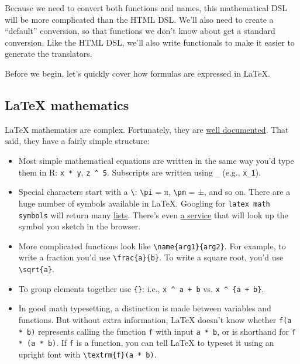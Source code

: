 Because we need to convert both functions and names, this mathematical
DSL will be more complicated than the HTML DSL. We'll also need to
create a ``default'' conversion, so that functions we don't know about
get a standard conversion. Like the HTML DSL, we'll also write
functionals to make it easier to generate the translators.

Before we begin, let's quickly cover how formulas are expressed in
LaTeX.

\subsection{LaTeX mathematics}

LaTeX mathematics are complex. Fortunately, they are
\href{http://en.wikibooks.org/wiki/LaTeX/Mathematics}{well documented}.
That said, they have a fairly simple structure:

\begin{itemize}
\item
  Most simple mathematical equations are written in the same way you'd
  type them in R: \texttt{x * y}, \texttt{z \^{} 5}. Subscripts are
  written using \texttt{\_} (e.g., \texttt{x\_1}).
\item
  Special characters start with a \texttt{\textbackslash{}}:
  \texttt{\textbackslash{}pi} = π, \texttt{\textbackslash{}pm} = ±, and
  so on. There are a huge number of symbols available in LaTeX. Googling
  for \texttt{latex math symbols} will return many
  \href{http://www.sunilpatel.co.uk/latex-type/latex-math-symbols/}{lists}.
  There's even \href{http://detexify.kirelabs.org/classify.html}{a
  service} that will look up the symbol you sketch in the browser.
\item
  More complicated functions look like
  \texttt{\textbackslash{}name\{arg1\}\{arg2\}}. For example, to write a
  fraction you'd use \texttt{\textbackslash{}frac\{a\}\{b\}}. To write a
  square root, you'd use \texttt{\textbackslash{}sqrt\{a\}}.
\item
  To group elements together use \texttt{\{\}}: i.e.,
  \texttt{x \^{} a + b} vs. \texttt{x \^{} \{a + b\}}.
\item
  In good math typesetting, a distinction is made between variables and
  functions. But without extra information, LaTeX doesn't know whether
  \texttt{f(a * b)} represents calling the function \texttt{f} with
  input \texttt{a * b}, or is shorthand for \texttt{f * (a * b)}. If
  \texttt{f} is a function, you can tell LaTeX to typeset it using an
  upright font with \texttt{\textbackslash{}textrm\{f\}(a * b)}.
\end{itemize}


